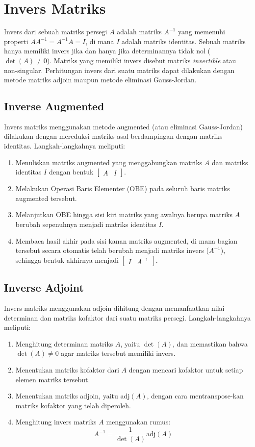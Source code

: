 \documentclass[12pt,a4paper]{report}
\begin{document}
\section{Invers Matriks}
Invers dari sebuah matriks persegi $A$ adalah matriks $A^{-1}$ yang memenuhi properti $AA^{-1} = A^{-1}A = I$, di mana $I$ adalah matriks identitas. Sebuah matriks hanya memiliki invers jika dan hanya jika determinannya tidak nol ($\det(A) \neq 0$). Matriks yang memiliki invers disebut matriks \textit{invertible} atau non-singular. Perhitungan invers dari suatu matriks dapat dilakukan dengan metode matriks adjoin maupun metode eliminasi Gauss-Jordan.

\subsection{Inverse Augmented}
Invers matriks menggunakan metode augmented (atau eliminasi Gauss-Jordan) dilakukan dengan mereduksi matriks asal berdampingan dengan matriks identitas. Langkah-langkahnya meliputi:
\begin{enumerate}
    \item Menuliskan matriks augmented yang menggabungkan matriks $A$ dan matriks identitas $I$ dengan bentuk $[\begin{array}{c|c} A & I \end{array}]$.
    \item Melakukan Operasi Baris Elementer (OBE) pada seluruh baris matriks augmented tersebut.
    \item Melanjutkan OBE hingga sisi kiri matriks yang awalnya berupa matriks $A$ berubah sepenuhnya menjadi matriks identitas $I$.
    \item Membaca hasil akhir pada sisi kanan matriks augmented, di mana bagian tersebut secara otomatis telah berubah menjadi matriks invers ($A^{-1}$), sehingga bentuk akhirnya menjadi $[\begin{array}{c|c} I & A^{-1} \end{array}]$.
\end{enumerate}

\subsection{Inverse Adjoint}
Invers matriks menggunakan adjoin dihitung dengan memanfaatkan nilai determinan dan matriks kofaktor dari suatu matriks persegi. Langkah-langkahnya meliputi:
\begin{enumerate}
    \item Menghitung determinan matriks $A$, yaitu $\det(A)$, dan memastikan bahwa $\det(A) \neq 0$ agar matriks tersebut memiliki invers.
    \item Menentukan matriks kofaktor dari $A$ dengan mencari kofaktor untuk setiap elemen matriks tersebut.
    \item Menentukan matriks adjoin, yaitu $\text{adj}(A)$, dengan cara mentranspose-kan matriks kofaktor yang telah diperoleh.
    \item Menghitung invers matriks $A$ menggunakan rumus:
    \[
    A^{-1} = \frac{1}{\det(A)} \text{adj}(A)
    \]
\end{enumerate}
\end{document}
